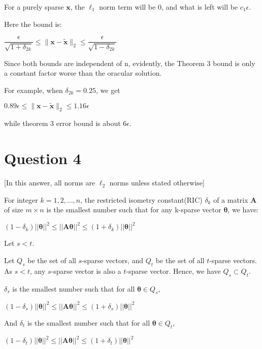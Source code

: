 \documentclass[fleqn, 11pt]{article}
\newcommand{\bs}[1]{\boldsymbol{#1}}
\begin{document}
For a purely sparse $\bs{x}$, the $\ell_1$ norm term will be 0, and what is left will be $c_1\epsilon$.

Here the bound is: 

\smallskip

$\dfrac{\epsilon}{\sqrt{1+\delta_{2k}}} \leq \|\boldsymbol{x}-\boldsymbol{\tilde{x}}\|_2 \leq
\dfrac{\epsilon}{\sqrt{1-\delta_{2k}}}$

Since both bounds are independent of n, evidently, the Theorem 3 bound is only a constant factor 
worse than the oracular solution.

For example, when $\delta_{2k}=0.25$, we get 

$  0.89 \epsilon     \leq \|\boldsymbol{x}-\boldsymbol{\tilde{x}}\|_2 \leq  1.16 \epsilon$

while theorem 3 error bound is about $6 \epsilon$.




\newpage
\section*{Question 4}
\setcounter{equation}{0}

[In this answer, all norms are $\ell_2$ norms unless stated otherwise]

For integer $k = 1,2, \ldots ,n$, the restricted isometry constant(RIC) $\delta_k$ of 
a matrix $\bs{A}$ of size $m \times n$ is the smallest number such that for any
k-sparse vector $\bs{\theta}$, we have:
\begin{center}
    $ (1-\delta_k) || \bs{\theta} ||^2 \leq || \bs{A\theta} ||^2 
    \leq (1+\delta_k) || \bs{\theta} ||^2 $
\end{center}


\medskip

Let $s<t$.

Let $Q_s$ be the set of all $s$-sparse vectors, and $Q_t$ be the set of all 
$t$-sparse vectors. As $s<t$, any $s$-sparse vector is also a $t$-sparse vector.
Hence, we have $Q_s \subset Q_t$.

$\delta_s$ is the smallest number such that for all $ \bs{\theta} \in Q_s$, 
\begin{center}
    $ (1-\delta_s) || \bs{\theta} ||^2 \leq || \bs{A\theta} ||^2 
    \leq (1+\delta_s) || \bs{\theta} ||^2 $
\end{center}

And $\delta_t$ is the smallest number such that for all $ \bs{\theta} \in Q_t$, 
\begin{center}
    $ (1-\delta_t) || \bs{\theta} ||^2 \leq || \bs{A\theta} ||^2 
    \leq (1+\delta_t) || \bs{\theta} ||^2 $
\end{center}
\end{document}
